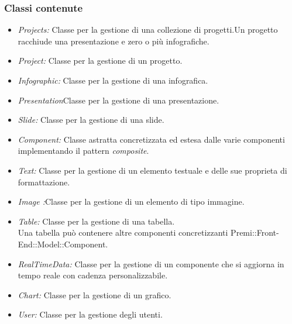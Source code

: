 	\subsubsection{Classi contenute}
		\begin{itemize}
		 \item \textit{Projects: }Classe per la gestione di una collezione di progetti.Un progetto racchiude una presentazione e zero o più infografiche.
		\end{itemize}
		\begin{itemize}
		 \item  \textit{Project: }Classe per la gestione di un progetto.
		\end{itemize}
		\begin{itemize}
		 \item  \textit{Infographic: }Classe per la gestione di una infografica.
		\end{itemize}
		\begin{itemize}
		 \item  \textit{Presentation}Classe per la gestione di una presentazione.
		\end{itemize}
		\begin{itemize}
		 \item  \textit{Slide: }Classe per la gestione di una slide.
		\end{itemize}
		\begin{itemize}
		 \item  \textit{Component: }Classe astratta concretizzata ed estesa dalle varie componenti implementando il pattern \textit{composite}.
		\end{itemize}
		\begin{itemize}
		 \item  \textit{Text: }Classe per la gestione di un elemento testuale e delle sue proprieta di formattazione.
		\end{itemize}
		\begin{itemize}
		 \item  \textit{Image :}Classe per la gestione di un elemento di tipo immagine.
		\end{itemize}
		\begin{itemize}
		 \item  \textit{Table: }Classe per la gestione di una tabella. \\Una tabella può contenere altre componenti concretizzanti Premi::Front-End::Model::Component.
		\end{itemize}
		\begin{itemize}
		 \item  \textit{RealTimeData: }Classe per la gestione di un componente che si aggiorna in tempo reale con cadenza personalizzabile.
		\end{itemize}
		\begin{itemize}
		 \item  \textit{Chart: }Classe per la gestione di un grafico.
		\end{itemize}
		\begin{itemize}
		 \item  \textit{User: }Classe per la gestione degli utenti.
		\end{itemize}

